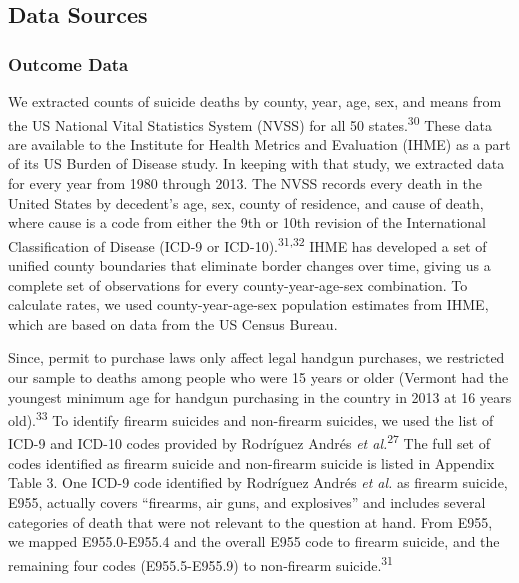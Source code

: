 \documentclass[]{article}
\begin{document}
\subsection{Data Sources}\label{data-sources}

\subsubsection{Outcome Data}\label{outcome-data}

We extracted counts of suicide deaths by county, year, age, sex, and
means from the US National Vital Statistics System (NVSS) for all 50
states.\textsuperscript{30} These data are available to the Institute
for Health Metrics and Evaluation (IHME) as a part of its US Burden of
Disease study. In keeping with that study, we extracted data for every
year from 1980 through 2013. The NVSS records every death in the United
States by decedent's age, sex, county of residence, and cause of death,
where cause is a code from either the 9th or 10th revision of the
International Classification of Disease (ICD-9 or
ICD-10).\textsuperscript{31,32} IHME has developed a set of unified
county boundaries that eliminate border changes over time, giving us a
complete set of observations for every county-year-age-sex combination.
To calculate rates, we used county-year-age-sex population estimates
from IHME, which are based on data from the US Census Bureau.

Since, permit to purchase laws only affect legal handgun purchases, we
restricted our sample to deaths among people who were 15 years or older
(Vermont had the youngest minimum age for handgun purchasing in the
country in 2013 at 16 years old).\textsuperscript{33} To identify
firearm suicides and non-firearm suicides, we used the list of ICD-9 and
ICD-10 codes provided by Rodríguez Andrés \emph{et
al.}\textsuperscript{27} The full set of codes identified as firearm
suicide and non-firearm suicide is listed in Appendix Table 3. One ICD-9
code identified by Rodríguez Andrés \emph{et al.} as firearm suicide,
E955, actually covers ``firearms, air guns, and explosives'' and
includes several categories of death that were not relevant to the
question at hand. From E955, we mapped E955.0-E955.4 and the overall
E955 code to firearm suicide, and the remaining four codes
(E955.5-E955.9) to non-firearm suicide.\textsuperscript{31}
\end{document}
